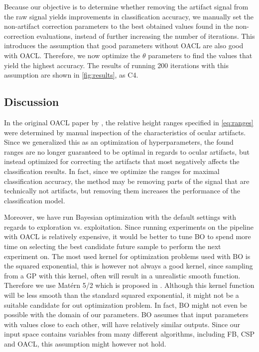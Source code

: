 Because our objective is to determine whether removing the artifact signal from the raw signal yields improvements in classification accuracy, we manually set the non-artifact correction parameters to the best obtained values found in the non-correction evaluations, instead of further increasing the number of iterations. This introduces the assumption that good parameters without OACL are also good with OACL. Therefore, we now optimize the $\theta$ parameters to find the values that yield the highest accuracy. The results of running 200 iterations with this assumption are shown in \cref{fig:results}, as C4. 

\subsection{Discussion}\label{sec:discussion}
In the original OACL paper by \citep{li2015ocular}, the relative height ranges specified in \cref{eq:ranges} were determined by manual inspection of the characteristics of ocular artifacts. Since we generalized this as an optimization of hyperparameters, the found ranges are no longer guaranteed to be optimal in regards to ocular artifacts, but instead optimized for correcting the artifacts that most negatively affects the classification results. In fact, since we optimize the ranges for maximal classification accuracy, the method may be removing parts of the signal that are technically not artifacts, but removing them increases the performance of the classification model.

Moreover, we have run Bayesian optimization with the default settings with regards to exploration vs. exploitation. Since running experiments on the pipeline with OACL is relatively expensive, it would be better to tune BO to spend more time on selecting the best candidate future sample to perform the next experiment on. The most used kernel for optimization problems used with BO is the squared exponential, this is however not always a good kernel, since sampling from a GP with this kernel, often will result in a unrealistic smooth function. Therefore we use Matérn 5/2 which is proposed in \citep{snoek2012practical}. Although this kernel function will be less smooth than the standard squared exponential, it might not be a suitable candidate for out optimization problem. In fact, BO might not even be possible with the domain of our parameters. BO assumes that input parameters with values close to each other, will have relatively similar outputs. Since our input space contains variables from many different algorithms, including FB, CSP and OACL, this assumption might however not hold. 

